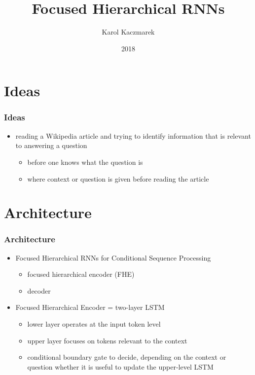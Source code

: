 \documentclass{beamer}
\title{Focused Hierarchical RNNs}
\date{2018}
\author{Karol Kaczmarek}
\begin{document}
\begin{frame}
    \titlepage
\end{frame}



\section{Ideas}

\begin{frame}
    \frametitle{Ideas}
    \begin{itemize}
        \item reading a Wikipedia article and trying to identify information that is relevant to answering a question
        \begin{itemize}
            \item before one knows what the question is
            \item where context or question is given before reading the article
        \end{itemize}
    \end{itemize}
\end{frame}


\section{Architecture}

\begin{frame}
    \frametitle{Architecture}
    \begin{itemize}
        \item Focused Hierarchical RNNs for Conditional Sequence Processing \cite{focused_hierarchical_rnns}
        \begin{itemize}
            \item focused hierarchical encoder (FHE)
            \item decoder
        \end{itemize}
        \item Focused Hierarchical Encoder = two-layer LSTM
        \begin{itemize}
            \item lower layer operates at the input token level
            \item upper layer focuses on tokens relevant to the context
            \item conditional boundary gate to decide, depending on the context or question whether it is useful to update the upper-level LSTM
        \end{itemize}
    \end{itemize}
\end{frame}
\end{document}
